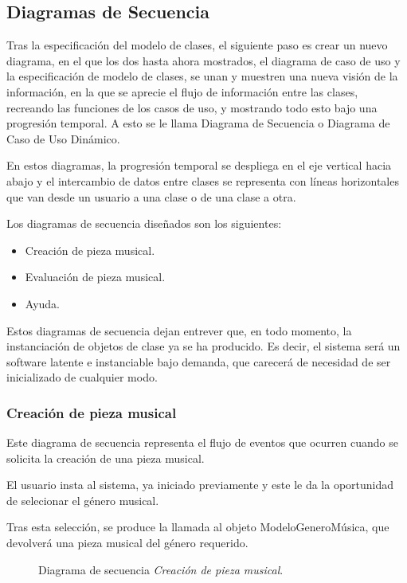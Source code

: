 
\subsection{Diagramas de Secuencia}

Tras la especificación del modelo de clases, el siguiente paso es crear un nuevo diagrama, en el que los dos hasta ahora mostrados, el diagrama de caso de uso y la especificación de modelo de clases, se unan y muestren una nueva visión de la información, en la que se aprecie el flujo de información entre las clases, recreando las funciones de los casos de uso, y mostrando todo esto bajo una progresión temporal. A esto se le llama Diagrama de Secuencia o Diagrama de Caso de Uso Dinámico.

En estos diagramas, la progresión temporal se despliega en el eje vertical hacia abajo y el intercambio de datos entre clases se representa con líneas horizontales que van desde un usuario a una clase o de una clase a otra.

Los diagramas de secuencia diseñados son los siguientes:

\begin{itemize}
    \item Creación de pieza musical.
    \item Evaluación de pieza musical.
    \item Ayuda.
\end{itemize}

Estos diagramas de secuencia dejan entrever que, en todo momento, la instanciación de objetos de clase ya se ha producido. Es decir, el sistema será un software latente e instanciable bajo demanda, que carecerá de necesidad de ser inicializado de cualquier modo.

\newpage
\subsubsection{Creación de pieza musical}

Este diagrama de secuencia representa el flujo de eventos que ocurren cuando se solicita la creación de una pieza musical.

El usuario insta al sistema, ya iniciado previamente y este le da la oportunidad de selecionar el género musical.

Tras esta selección, se produce la llamada al objeto ModeloGeneroMúsica, que devolverá una pieza musical del género requerido.

\begin{figure}[H]
  \centering
  
  \caption{Diagrama de secuencia \emph{Creación de pieza musical}.}
\end{figure}

